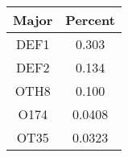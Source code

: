 
\begin{center}
    \begin{tabular}{|c| c|}
        \hline 
        Major & Percent \\
        \hline
        DEF1 & 0.303 \\
        \hline
        DEF2 & 0.134 \\
        \hline
        OTH8 & 0.100 \\
        \hline
        O174 & 0.0408 \\
        \hline
        OT35 & 0.0323 \\
        \hline
    \end{tabular}
\end{center}